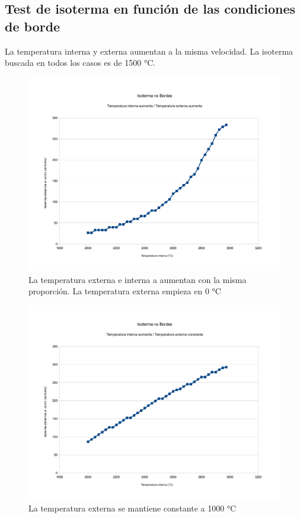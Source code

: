 \subsection{Test de isoterma en función de las condiciones de borde}

La temperatura interna y externa aumentan a la misma velocidad. La isoterma buscada en todos los casos es de 1500 °C.

\begin{figure}[H]{}
\centering
\includegraphics[scale=0.5]{graphs/isotermaVsBordesExternaAumenta.pdf}
\caption{La temperatura externa e interna a aumentan con la misma proporción. La temperatura externa empieza en 0 °C}
\label{isotermaVsBordesExternaAumenta}
\end{figure}

\begin{figure}[H]{}
\centering
\includegraphics[scale=0.5]{graphs/isotermaVsBordesExternaConstante.pdf}
\caption{La temperatura externa se mantiene constante a 1000 °C}
\label{isotermaVsBordesExternaConstante}
\end{figure}

